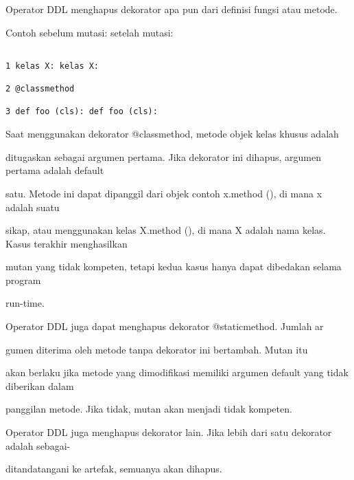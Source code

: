 Operator DDL menghapus dekorator apa pun dari definisi fungsi atau metode.

Contoh sebelum mutasi: setelah mutasi:

\begin{verbatim}

1 kelas X: kelas X:

2 @classmethod

3 def foo (cls): def foo (cls):

\end{verbatim}

Saat menggunakan dekorator @classmethod, metode objek kelas khusus adalah

ditugaskan sebagai argumen pertama. Jika dekorator ini dihapus, argumen pertama adalah default

satu. Metode ini dapat dipanggil dari objek contoh x.method (), di mana x adalah suatu

sikap, atau menggunakan kelas X.method (), di mana X adalah nama kelas. Kasus terakhir menghasilkan

mutan yang tidak kompeten, tetapi kedua kasus hanya dapat dibedakan selama program

run-time.\
\

Operator DDL juga dapat menghapus dekorator @staticmethod. Jumlah ar

gumen diterima oleh metode tanpa dekorator ini bertambah. Mutan itu

akan berlaku jika metode yang dimodifikasi memiliki argumen default yang tidak diberikan dalam

panggilan metode. Jika tidak, mutan akan menjadi tidak kompeten.

Operator DDL juga menghapus dekorator lain. Jika lebih dari satu dekorator adalah sebagai-

ditandatangani ke artefak, semuanya akan dihapus.



